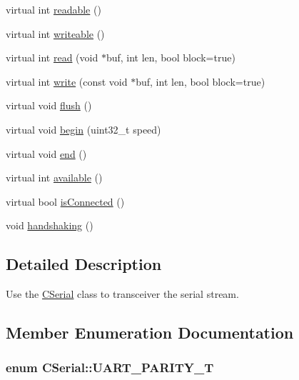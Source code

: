 \begin{DoxyCompactItemize}
\item 
virtual int \hyperlink{class_c_serial_a0748723f610ddcfdc34286dbbfbd4917}{readable} ()
\item 
virtual int \hyperlink{class_c_serial_ac59cfe80216e1fb7eb479017f0bb8e7f}{writeable} ()
\item 
virtual int \hyperlink{class_c_serial_a9b658bf4bc4d81413627bc2fe81e1471}{read} (void $\ast$buf, int len, bool block=true)
\item 
virtual int \hyperlink{class_c_serial_adef6d3e77843c65617b7cb555c2f8732}{write} (const void $\ast$buf, int len, bool block=true)
\item 
virtual void \hyperlink{class_c_serial_a68aecf6351423ae0e8791870c9e694bf}{flush} ()
\item 
virtual void \hyperlink{class_c_serial_a678403bcefc3bd7dfc603c334383b8df}{begin} (uint32\-\_\-t speed)
\item 
virtual void \hyperlink{class_c_serial_a4fb5a06c1d1f746c834088c8beeb3097}{end} ()
\item 
virtual int \hyperlink{class_c_serial_a5c142221c0841e7c961e962c45bd2db7}{available} ()
\item 
virtual bool \hyperlink{class_c_serial_ae7c133c4586cd5ca729cd026f813a8a0}{is\-Connected} ()
\item 
void \hyperlink{class_c_serial_a9dc5498e6cae5a2d0d12cb57fc6ee335}{handshaking} ()
\end{DoxyCompactItemize}


\subsection{Detailed Description}
Use the \hyperlink{class_c_serial}{C\-Serial} class to transceiver the serial stream. 

\subsection{Member Enumeration Documentation}
\hypertarget{class_c_serial_ad38b0926868c6cfabb59e2da94f1cf40}{
\subsubsection[{U\-A\-R\-T\-\_\-\-P\-A\-R\-I\-T\-Y\-\_\-\-T}]{\setlength{\rightskip}{0pt plus 5cm}enum {\bf C\-Serial\-::\-U\-A\-R\-T\-\_\-\-P\-A\-R\-I\-T\-Y\-\_\-\-T}}}\label{class_c_serial_ad38b0926868c6cfabb59e2da94f1cf40}


